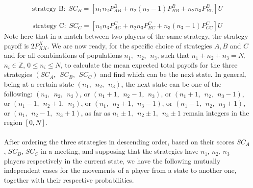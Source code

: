 \documentclass[12pt]{article}
\begin{document}
$$\text{strategy B:} \ \ SC_B=[n_1n_2P_{AB}^B+n_2(n_2-1)P_{BB}^B+n_2n_3P_{BC}^B]U$$

$$\text{strategy C:} \ \ SC_C=[n_1n_3P_{AC}^C+n_2n_3P_{BC}^C+n_3(n_3-1)P_{CC}^C]U$$
Note here that in a match between two players of the same strategy, the strategy payoff is $2P_{XX}^X$. We are now ready, for the specific choice of strategies $A, B$ and $C$ and for all combinations of populations $n_1, \ \ n_2, \ \ n_3$, such that $n_1+n_2+n_3=N$, $n_i\in \mathbb{Z}$, $0\le n_i\le N$, to calculate the mean expected total payoffs for the three strategies $(SC_A,\ \  SC_B ,\ \ SC_C)$ and find which can be the next state. In general, being at a certain state $(n_1, \ \ n_2, \ \ n_3)$, the next state can be one of the following: $(n_1, \ \ n_2, \ \ n_3)$, or $(n_1+1, \ \ n_2-1, \ \ n_3)$, or $(n_1+1, \ \ n_2, \ \ n_3-1)$, or $(n_1-1, \ \ n_2+1, \ \ n_3)$, or $(n_1, \ \ n_2+1, \ \ n_3-1)$, or $(n_1-1, \ \ n_2, \ \ n_3+1)$, or $(n_1, \ \ n_2-1, \ \ n_3+1)$, as far as $n_1\pm1, \ \ n_2\pm1, \ \ n_3\pm1$ remain integers in the region $[0,N]$.
\\\\
After ordering the three strategies in descending order, based on their scores ${SC}_A$, ${SC}_B$, ${SC}_C$ in a meeting, and supposing that the strategies have $n_1$, $n_2$, $n_3$ players respectively in the current state, we have the following mutually independent cases for the movements of a player from a state to another one, together with their respective probabilities.
\end{document}

